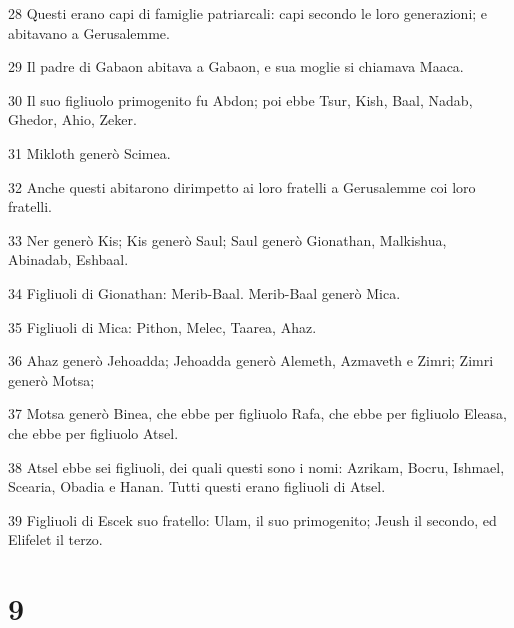 \par 28 Questi erano capi di famiglie patriarcali: capi secondo le loro generazioni; e abitavano a Gerusalemme.
\par 29 Il padre di Gabaon abitava a Gabaon, e sua moglie si chiamava Maaca.
\par 30 Il suo figliuolo primogenito fu Abdon; poi ebbe Tsur, Kish, Baal, Nadab, Ghedor, Ahio, Zeker.
\par 31 Mikloth generò Scimea.
\par 32 Anche questi abitarono dirimpetto ai loro fratelli a Gerusalemme coi loro fratelli.
\par 33 Ner generò Kis; Kis generò Saul; Saul generò Gionathan, Malkishua, Abinadab, Eshbaal.
\par 34 Figliuoli di Gionathan: Merib-Baal. Merib-Baal generò Mica.
\par 35 Figliuoli di Mica: Pithon, Melec, Taarea, Ahaz.
\par 36 Ahaz generò Jehoadda; Jehoadda generò Alemeth, Azmaveth e Zimri; Zimri generò Motsa;
\par 37 Motsa generò Binea, che ebbe per figliuolo Rafa, che ebbe per figliuolo Eleasa, che ebbe per figliuolo Atsel.
\par 38 Atsel ebbe sei figliuoli, dei quali questi sono i nomi: Azrikam, Bocru, Ishmael, Scearia, Obadia e Hanan. Tutti questi erano figliuoli di Atsel.
\par 39 Figliuoli di Escek suo fratello: Ulam, il suo primogenito; Jeush il secondo, ed Elifelet il terzo.

\chapter{9}

